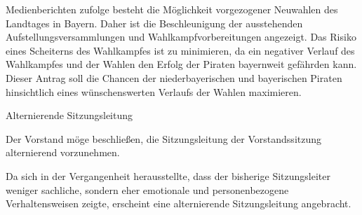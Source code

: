 \documentclass{protokoll}
\begin{document}
\begin{Antrag}
\begin{Begründung}
Medienberichten zufolge besteht die Möglichkeit vorgezogener Neuwahlen
des Landtages in Bayern. Daher ist die Beschleunigung der ausstehenden
Aufstellungsversammlungen und Wahlkampfvorbereitungen angezeigt.  Das
Risiko eines Scheiterns des Wahlkampfes ist zu minimieren, da ein
negativer Verlauf des Wahlkampfes und der Wahlen den Erfolg der
Piraten bayernweit gefährden kann.  Dieser Antrag soll die Chancen der
niederbayerischen und bayerischen Piraten hinsichtlich eines
wünschenswerten Verlaufs der Wahlen maximieren.
\end{Begründung}



\end{Antrag}


\begin{Antrag}
        {Alternierende Sitzungsleitung}
        {\abgelehnt}


\begin{Text}
Der Vorstand möge beschließen, die Sitzungsleitung der Vorstandssitzung alternierend vorzunehmen.
\end{Text}

\begin{Begründung}
Da sich in der Vergangenheit herausstellte, dass der bisherige
Sitzungsleiter weniger sachliche, sondern eher emotionale und
personenbezogene Verhaltensweisen zeigte, erscheint eine alternierende
Sitzungsleitung angebracht.
\end{Begründung}


\end{Antrag}
\end{document}
